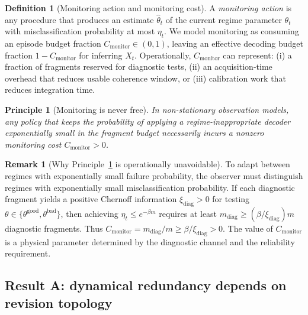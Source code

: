 \documentclass[11pt]{article}
\newcommand{\1}{\mathbf{1}}
\theoremstyle{definition}
\newtheorem{definition}{Definition}
\newtheorem{remark}{Remark}
\theoremstyle{plain}
\newtheorem{principle}{Principle}
\begin{document}
\begin{definition}[Monitoring action and monitoring cost]
\label{def:monitoring-cost}
A \emph{monitoring action} is any procedure that produces an estimate $\widehat{\theta}_t$ of the current regime parameter $\theta_t$ with misclassification probability at most $\eta_t$.
We model monitoring as consuming an episode budget fraction $C_{\mathrm{monitor}}\in(0,1)$, leaving an effective decoding budget fraction $1-C_{\mathrm{monitor}}$ for inferring $X_t$.
Operationally, $C_{\mathrm{monitor}}$ can represent: (i) a fraction of fragments reserved for diagnostic tests, (ii) an acquisition-time overhead that reduces usable coherence window, or (iii) calibration work that reduces integration time.
\end{definition}

\begin{principle}[Monitoring is never free]
\label{prin:monitoring-positive}
In non-stationary observation models, any policy that keeps the probability of applying a regime-inappropriate decoder exponentially small in the fragment budget necessarily incurs a nonzero monitoring cost $C_{\mathrm{monitor}}>0$.
\end{principle}

\begin{remark}[Why Principle~\ref{prin:monitoring-positive} is operationally unavoidable]
To adapt between regimes with exponentially small failure probability, the observer must distinguish regimes with exponentially small misclassification probability.
If each diagnostic fragment yields a positive Chernoff information $\xi_{\mathrm{diag}}>0$ for testing $\theta\in\{\theta^{\mathrm{good}},\theta^{\mathrm{bad}}\}$, then achieving $\eta_t\le e^{-\beta m}$ requires at least $m_{\mathrm{diag}}\ge (\beta/\xi_{\mathrm{diag}})m$ diagnostic fragments.
Thus $C_{\mathrm{monitor}}=m_{\mathrm{diag}}/m\ge \beta/\xi_{\mathrm{diag}}>0$.
The value of $C_{\mathrm{monitor}}$ is a physical parameter determined by the diagnostic channel and the reliability requirement.
\end{remark}

\subsection{Result A: dynamical redundancy depends on revision topology}
\end{document}
